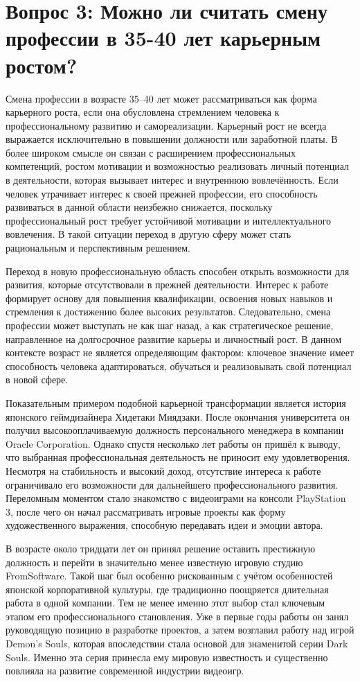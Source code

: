 \documentclass[14pt,a4paper]{extarticle}
\begin{document}
\section{Вопрос 3: Можно ли считать смену профессии в 35-40 лет карьерным ростом?}

Смена профессии в возрасте 35–40 лет может рассматриваться как форма карьерного роста, если она обусловлена стремлением человека к профессиональному развитию и самореализации. Карьерный рост не всегда выражается исключительно в повышении должности или заработной платы. В более широком смысле он связан с расширением профессиональных компетенций, ростом мотивации и возможностью реализовать личный потенциал в деятельности, которая вызывает интерес и внутреннюю вовлечённость. Если человек утрачивает интерес к своей прежней профессии, его способность развиваться в данной области неизбежно снижается, поскольку профессиональный рост требует устойчивой мотивации и интеллектуального вовлечения. В такой ситуации переход в другую сферу может стать рациональным и перспективным решением.

Переход в новую профессиональную область способен открыть возможности для развития, которые отсутствовали в прежней деятельности. Интерес к работе формирует основу для повышения квалификации, освоения новых навыков и стремления к достижению более высоких результатов. Следовательно, смена профессии может выступать не как шаг назад, а как стратегическое решение, направленное на долгосрочное развитие карьеры и личностный рост. В данном контексте возраст не является определяющим фактором: ключевое значение имеет способность человека адаптироваться, обучаться и реализовывать свой потенциал в новой сфере.

Показательным примером подобной карьерной трансформации является история японского геймдизайнера Хидетаки Миядзаки. После окончания университета он получил высокооплачиваемую должность персонального менеджера в компании Oracle Corporation. Однако спустя несколько лет работы он пришёл к выводу, что выбранная профессиональная деятельность не приносит ему удовлетворения. Несмотря на стабильность и высокий доход, отсутствие интереса к работе ограничивало его возможности для дальнейшего профессионального развития. Переломным моментом стало знакомство с видеоиграми на консоли PlayStation 3, после чего он начал рассматривать игровые проекты как форму художественного выражения, способную передавать идеи и эмоции автора.

В возрасте около тридцати лет он принял решение оставить престижную должность и перейти в значительно менее известную игровую студию FromSoftware. Такой шаг был особенно рискованным с учётом особенностей японской корпоративной культуры, где традиционно поощряется длительная работа в одной компании. Тем не менее именно этот выбор стал ключевым этапом его профессионального становления. Уже в первые годы работы он занял руководящую позицию в разработке проектов, а затем возглавил работу над игрой Demon's Souls, которая впоследствии стала основой для знаменитой серии Dark Souls. Именно эта серия принесла ему мировую известность и существенно повлияла на развитие современной индустрии видеоигр.
\end{document}
